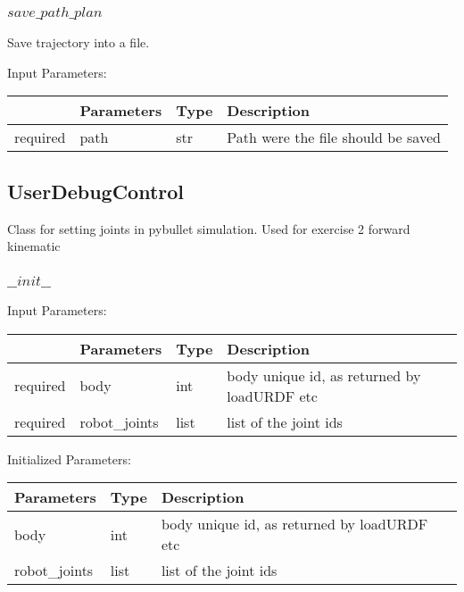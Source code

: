 \documentclass[
	ngerman,
	accentcolor=9c,%
	type=intern,
	marginpar=false
	]{tudapub}
\begin{document}
\subsubsection{$save\_path\_plan$}
\noindent Save trajectory into a file.

\vspace{0.5cm}
\noindent Input Parameters:
\vspace{0.5cm}

\begin{tabular}{|p{}|p{}|p{}| p{}|}
\hline
 & \textbf{Parameters} & \textbf{Type} & \textbf{Description} \\
\hline
required & path & str & Path were the file should be saved\\
\hline
\end{tabular}
\vspace{1cm}



\subsection{UserDebugControl}
Class for setting joints in pybullet simulation. Used for exercise 2 forward kinematic

\subsubsection{$\_\_init\_\_$}

\noindent Input Parameters:
\vspace{0.5cm}


\begin{tabular}{|p{}|p{}|p{}| p{}|}
\hline
 & \textbf{Parameters} & \textbf{Type} & \textbf{Description} \\
\hline
required & body & int & body unique id, as returned by loadURDF etc \\
\hline
required & robot\_joints & list & list of the joint ids \\
\hline
\end{tabular}

\vspace{0.5cm}

\noindent Initialized Parameters:

\vspace{0.5cm}

\begin{tabular}{|p{}| p{}| p{}|}
\hline
\textbf{Parameters} & \textbf{Type} & \textbf{Description} \\
\hline
 body & int & body unique id, as returned by loadURDF etc \\
\hline
 robot\_joints & list & list of the joint ids \\
\hline
\end{tabular}
\end{document}
